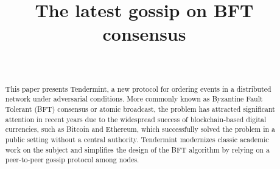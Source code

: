 \documentclass[conference,onecolumn,draft,a4paper]{IEEEtran}
\begin{document}
%
\title{The latest gossip on BFT consensus\vspace{-0.7\baselineskip}}



\author{
	\\
}

\maketitle
\vspace*{0.5em}

\begin{abstract}
This paper presents Tendermint, a new protocol for ordering events in a distributed network under adversarial conditions. More commonly known as Byzantine Fault Tolerant (BFT) consensus or atomic broadcast, the problem has attracted significant attention in recent years due to the widespread success of blockchain-based digital currencies, such as Bitcoin and Ethereum, which successfully solved the problem in a public setting without a central authority. Tendermint modernizes classic academic work on the subject and simplifies the design of the BFT algorithm by relying on a peer-to-peer gossip protocol among nodes. 
\end{abstract}











\end{document}
